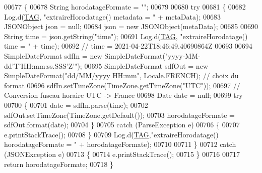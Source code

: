 \begin{DoxyCode}
00677     \{
00678         String horodatageFormate = \textcolor{stringliteral}{""};
00679 
00680         \textcolor{keywordflow}{try}
00681         \{
00682             Log.d(\hyperlink{classcom_1_1example_1_1bee__honeyt_1_1_i_h_m_mobile_a366987bf9bb2ed1010b2f967d4efa263}{TAG}, \textcolor{stringliteral}{"extraireHorodatage() metadata = "} + metaData);
00683             JSONObject json = null;
00684             json = \textcolor{keyword}{new} JSONObject(metaData);
00685 
00690             String time = json.getString(\textcolor{stringliteral}{"time"});
00691             Log.d(\hyperlink{classcom_1_1example_1_1bee__honeyt_1_1_i_h_m_mobile_a366987bf9bb2ed1010b2f967d4efa263}{TAG}, \textcolor{stringliteral}{"extraireHorodatage() time = "} + time);
00692             \textcolor{comment}{// time = 2021-04-22T18:46:49.40690864Z}
00693 
00694             SimpleDateFormat sdfIn = \textcolor{keyword}{new} SimpleDateFormat(\textcolor{stringliteral}{"yyyy-MM-dd'T'HH:mm:ss.SSS'Z'"});
00695             SimpleDateFormat sdfOut = \textcolor{keyword}{new} SimpleDateFormat(\textcolor{stringliteral}{"dd/MM/yyyy HH:mm"}, Locale.FRENCH); \textcolor{comment}{// choix du
       format}
00696             sdfIn.setTimeZone(TimeZone.getTimeZone(\textcolor{stringliteral}{"UTC"}));
00697             \textcolor{comment}{// Conversion fuseau horaire UTC -> France}
00698             Date date = null;
00699             \textcolor{keywordflow}{try}
00700             \{
00701                 date = sdfIn.parse(time);
00702                 sdfOut.setTimeZone(TimeZone.getDefault());
00703                 horodatageFormate = sdfOut.format(date);
00704             \}
00705             \textcolor{keywordflow}{catch} (ParseException e)
00706             \{
00707                 e.printStackTrace();
00708             \}
00709             Log.d(\hyperlink{classcom_1_1example_1_1bee__honeyt_1_1_i_h_m_mobile_a366987bf9bb2ed1010b2f967d4efa263}{TAG},\textcolor{stringliteral}{"extraireHorodatage() horodatageFormate = "} + horodatageFormate);
00710 
00711         \}
00712         \textcolor{keywordflow}{catch} (JSONException e)
00713         \{
00714             e.printStackTrace();
00715         \}
00716 
00717         \textcolor{keywordflow}{return} horodatageFormate;
00718     \}
\end{DoxyCode}
\mbox{\label{classcom_1_1example_1_1bee__honeyt_1_1_i_h_m_mobile_aabe15decc02b7f56a82f60dac75f8c2f}} 
